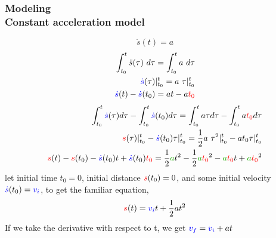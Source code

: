 \documentclass[hyperref={pdfpagelabels=true}]{beamer}
\begin{document}
\begin{frame}
\frametitle{Modeling\\ {\large Constant acceleration model}} 
\tiny{
$$\ddot{s}(t)=a$$
\noindent\makebox[\linewidth]{\rule{10 cm}{0.1pt}}
\begin{align*}
\int_{t_0}^t \ddot{s}(\tau) \ d\tau=\int_{t_0}^t a \ d\tau \\
\textcolor{blue}{\dot{s}}(\tau)|^t_{t_0} = a \  \tau|^t_{t_0} \\
\textcolor{blue}{\dot{s}}(t) - \textcolor{blue}{\dot{s}}(t_0) = at-a\textcolor{red}{t_0}
\end{align*}
\noindent\makebox[\linewidth]{\rule{10 cm}{0.1pt}}
\begin{align*}
\int_{t_0}^t \textcolor{blue}{\dot{s}}(\tau)d\tau - \int_{t_0}^t \textcolor{blue}{\dot{s}}(t_0) d \tau = \int_{t_0}^t a\tau d\tau - \int_{t_0}^t a\textcolor{red}{t_0}d\tau \\
\textcolor{red}{s}(\tau)|^t_{t_0}-\textcolor{blue}{\dot{s}}(t_0)\tau|^t_{t_0}  = \frac{1}{2}a \  \tau^2|^t_{t_0}-at_0\tau|^t_{t_0} \\
\textcolor{red}{s}(t)-\textcolor{red}{s}(t_0)-\textcolor{blue}{\dot s}(t_0)t+\textcolor{blue}{\dot s}(t_0)\textcolor{red}{t_0}=\frac{1}{2}\textcolor{mygreen}{a}t^2-\frac{1}{2}\textcolor{mygreen}{a}\textcolor{red}{t_0}^2-\textcolor{mygreen}{a}\textcolor{red}{t_0}t+\textcolor{mygreen}{a}\textcolor{red}{t_0}^2
\end{align*}
\noindent\makebox[\linewidth]{\rule{10 cm}{0.1pt}}
let initial time $t_0 = 0$, initial distance $\textcolor{red}{s}(t_ 0) = 0$, and some initial velocity
$\textcolor{blue}{\dot s}(t_0) = \textcolor{blue}{v_i}$, to get the familiar equation,
$$\textcolor{red}{s}(t)=\textcolor{blue}{v_i}t+\frac{1}{2}at^2$$
If we take the derivative with respect to t, we get $\textcolor{blue}{v_f}= \textcolor{blue}{v_i} + at$
}
\end{frame}
\end{document}
